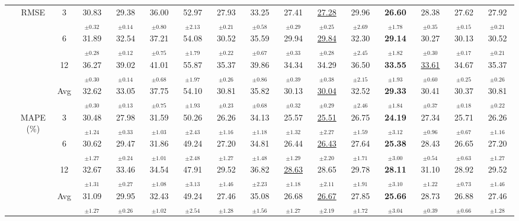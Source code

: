 \begin{table}[t]
{\begin{tabular}{ccc|ccc|cccc|cccc|cc}
\cmidrule(lr){2-16}
 & \multirow{4}{*}{RMSE} & 3 & 30.83$_{\pm0.32}$ & 29.38$_{\pm0.14}$ & 36.00$_{\pm0.80}$ & 52.97$_{\pm2.13}$ & 27.93$_{\pm0.21}$ & 33.25$_{\pm0.58}$ & 27.41$_{\pm0.29}$ & \underline{27.28$_{\pm0.25}$} & 29.96$_{\pm2.69}$ & \textbf{26.60$_{\pm1.78}$} & 28.38$_{\pm0.35}$ & 27.62$_{\pm0.15}$ & 27.92$_{\pm0.21}$ \\
 &  & 6 & 31.89$_{\pm0.28}$ & 32.54$_{\pm0.12}$ & 37.21$_{\pm0.75}$ & 54.08$_{\pm1.79}$ & 30.52$_{\pm0.22}$ & 35.59$_{\pm0.67}$ & 29.94$_{\pm0.33}$ & \underline{29.84$_{\pm0.28}$} & 32.30$_{\pm2.45}$ & \textbf{29.14$_{\pm1.82}$} & 30.27$_{\pm0.30}$ & 30.13$_{\pm0.17}$ & 30.52$_{\pm0.21}$ \\
 &  & 12 & 36.27$_{\pm0.30}$ & 39.02$_{\pm0.14}$ & 41.01$_{\pm0.68}$ & 55.87$_{\pm1.97}$ & 35.37$_{\pm0.26}$ & 39.86$_{\pm0.86}$ & 34.34$_{\pm0.39}$ & 34.29$_{\pm0.38}$ & 36.50$_{\pm2.15}$ & \textbf{33.55$_{\pm1.93}$} & \underline{33.61$_{\pm0.60}$} & 34.67$_{\pm0.25}$ & 35.37$_{\pm0.26}$ \\
 &  & Avg & 32.62$_{\pm0.30}$ & 33.05$_{\pm0.13}$ & 37.75$_{\pm0.75}$ & 54.10$_{\pm1.93}$ & 30.81$_{\pm0.23}$ & 35.82$_{\pm0.68}$ & 30.13$_{\pm0.32}$ & \underline{30.04$_{\pm0.29}$} & 32.52$_{\pm2.46}$ & \textbf{29.33$_{\pm1.84}$} & 30.41$_{\pm0.37}$ & 30.37$_{\pm0.18}$ & 30.81$_{\pm0.22}$ \\
\cmidrule(lr){2-16}
 & \multirow{4}{*}{MAPE (\%)} & 3 & 30.48$_{\pm1.24}$ & 27.98$_{\pm0.33}$ & 31.59$_{\pm1.03}$ & 50.26$_{\pm2.43}$ & 26.26$_{\pm1.16}$ & 34.13$_{\pm1.18}$ & 25.57$_{\pm1.32}$ & \underline{25.51$_{\pm2.27}$} & 26.75$_{\pm1.59}$ & \textbf{24.19$_{\pm3.12}$} & 27.34$_{\pm0.96}$ & 25.71$_{\pm0.67}$ & 26.26$_{\pm1.16}$ \\
 &  & 6 & 30.62$_{\pm1.27}$ & 29.47$_{\pm0.24}$ & 31.86$_{\pm1.01}$ & 49.24$_{\pm2.48}$ & 27.20$_{\pm1.27}$ & 34.81$_{\pm1.48}$ & 26.44$_{\pm1.29}$ & \underline{26.43$_{\pm2.20}$} & 27.64$_{\pm1.71}$ & \textbf{25.38$_{\pm3.00}$} & 28.43$_{\pm0.54}$ & 26.65$_{\pm0.63}$ & 27.20$_{\pm1.27}$ \\
 &  & 12 & 32.67$_{\pm1.31}$ & 33.46$_{\pm0.27}$ & 34.54$_{\pm1.08}$ & 47.91$_{\pm3.13}$ & 29.52$_{\pm1.46}$ & 36.82$_{\pm2.23}$ & \underline{28.63$_{\pm1.18}$} & 28.65$_{\pm2.11}$ & 29.78$_{\pm1.91}$ & \textbf{28.11$_{\pm3.10}$} & 31.10$_{\pm1.22}$ & 28.92$_{\pm0.73}$ & 29.52$_{\pm1.46}$ \\
 &  & Avg & 31.09$_{\pm1.27}$ & 29.95$_{\pm0.26}$ & 32.43$_{\pm1.02}$ & 49.24$_{\pm2.54}$ & 27.46$_{\pm1.28}$ & 35.08$_{\pm1.56}$ & 26.68$_{\pm1.27}$ & \underline{26.67$_{\pm2.19}$} & 27.85$_{\pm1.72}$ & \textbf{25.66$_{\pm3.04}$} & 28.73$_{\pm0.39}$ & 26.88$_{\pm0.66}$ & 27.46$_{\pm1.28}$ \\
\bottomrule
\end{tabular}%
}
\end{table}
